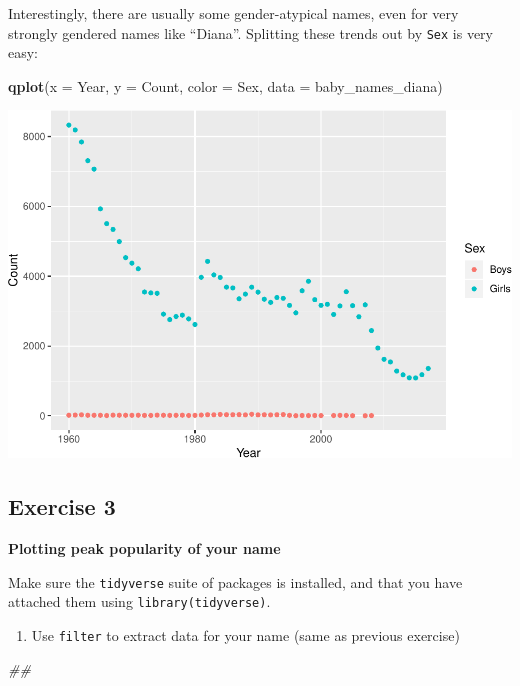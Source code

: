 \documentclass[]{book}
\newenvironment{Shaded}{\begin{snugshade}}{\end{snugshade}}
\newcommand{\CommentTok}[1]{\textcolor[rgb]{0.56,0.35,0.01}{\textit{#1}}}
\newcommand{\DataTypeTok}[1]{\textcolor[rgb]{0.13,0.29,0.53}{#1}}
\newcommand{\KeywordTok}[1]{\textcolor[rgb]{0.13,0.29,0.53}{\textbf{#1}}}
\newcommand{\NormalTok}[1]{#1}
\providecommand{\tightlist}{%
  \setlength{\itemsep}{0pt}\setlength{\parskip}{0pt}}
\begin{document}
Interestingly, there are usually some gender-atypical names, even for very strongly
gendered names like ``Diana''. Splitting these trends out by \texttt{Sex} is very easy:

\begin{Shaded}
\begin{Highlighting}[]
\KeywordTok{qplot}\NormalTok{(}\DataTypeTok{x =}\NormalTok{ Year, }\DataTypeTok{y =}\NormalTok{ Count, }\DataTypeTok{color =}\NormalTok{ Sex,}
      \DataTypeTok{data =}\NormalTok{ baby_names_diana)}
\end{Highlighting}
\end{Shaded}

\includegraphics{R/Rintro/figures/unnamed-chunk-32-1.pdf}

\hypertarget{exercise-3}{%
\subsection{Exercise 3}\label{exercise-3}}

\textbf{Plotting peak popularity of your name}

Make sure the \texttt{tidyverse} suite of packages is installed, and that you
have attached them using \texttt{library(tidyverse)}.

\begin{enumerate}
\def\labelenumi{\arabic{enumi}.}
\tightlist
\item
  Use \texttt{filter} to extract data for your name (same as previous exercise)
\end{enumerate}

\begin{Shaded}
\begin{Highlighting}[]
\CommentTok{##}
\end{Highlighting}
\end{Shaded}
\end{document}

